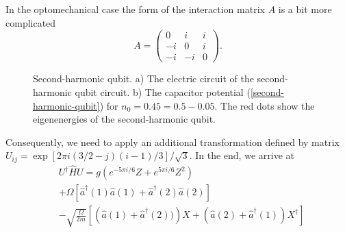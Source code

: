 \documentclass[reprint, aps, prx, amsmath, amssymb, longbibliography, superscriptaddress]{revtex4-2}
\begin{document}
In the optomechanical case the form of the interaction matrix $A$ is a bit more complicated
\begin{equation}
    A = \begin{pmatrix} 0 & i & i \\ -i & 0 & i \\ -i & -i & 0 \end{pmatrix}.
\end{equation}


\begin{figure}[t]
    \centering
     \hfill
    \caption{Second-harmonic qubit. a) The electric circuit of the second-harmonic qubit circuit. b) The capacitor potential (\ref{second-harmonic-qubit}) for $n_0 = 0.45 = 0.5 - 0.05 $. The red dots show the eigenenergies of the second-harmonic qubit.}
    \label{fig:second-harmonic-qubit}
\end{figure}


Consequently, we need to apply an additional transformation defined by matrix $U_{ij} = \exp[2\pi i(3/2 - j)(i-1)/3]/\sqrt{3}$. In the end, we arrive at
\begin{equation}
\begin{aligned}
    &U^{\dagger}\hat H U = g (e^{-5\pi i/6} Z + e^{5\pi i/6} Z^2) \\
    &+ \Omega \left[\hat a^{\dagger}(1) \hat a(1) + \hat a^{\dagger}(2) \hat a(2)\right] \\
    &- \sqrt{\frac{\Omega}{2 m}} \left[\left(\hat a(1) + \hat a^{\dagger}(2))\right) X  + \left(\hat a(2) + \hat a^{\dagger}(1)\right) X^{\dagger}  \right]
\end{aligned}
\end{equation}
\end{document}
